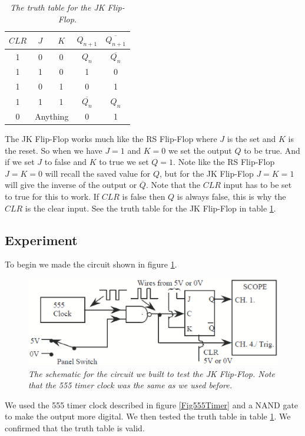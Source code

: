 \documentclass[11pt]{article}
\numberwithin{equation}{section}
\numberwithin{figure}{section}
\numberwithin{table}{section}
\begin{document}
\begin{table}[h]
\centering
\begin{tabular}{c|cc|cc}
$CLR$	&$J$	&$K$	&$Q_{n+1}$		&$\overline{Q_{n+1}}$\\
\hline
1	&0	&0	&$Q_n$			&$\overline{Q_n}$\\
1	&1	&0	&1			&0\\
1	&0	&1	&0			&1\\
1	&1	&1	&$\overline{Q_n}$	&$Q_n$\\
\hline
0	&\multicolumn{2}{c}{Anything}	&0	&1
\end{tabular}
\caption{\textit{The truth table for the JK Flip-Flop.}}
\label{TruthTabJK}
\end{table}
The JK Flip-Flop works much like the RS Flip-Flop where $J$ is the set and $K$ is the reset. So when we have $J=1$ and $K=0$ we set the output $Q$ to be true. And if we set $J$ to false and $K$ to true we set $Q=1$. Note like the RS Flip-Flop $J=K=0$ will recall the saved value for $Q$, but for the JK Flip-Flop $J=K=1$ will give the inverse of the output or $\overline{Q}$. Note that the $CLR$ input has to be set to true for this to work. If $CLR$ is false then $Q$ is always false, this is why the $CLR$ is the clear input. See the truth table for the JK Flip-Flop in table \ref{TruthTabJK}.

\subsection{Experiment}
To begin we made the circuit shown in figure \ref{FigSchemJKFlipFlop}.
\begin{figure}[h]
\centering
\includegraphics[scale=0.60]{FigSchemJKFlipFlop.eps}
\caption{\textit{The schematic for the circuit we built to test the JK Flip-Flop. Note that the 555 timer clock was the same as we used before.}}
\label{FigSchemJKFlipFlop}
\end{figure}
We used the 555 timer clock described in figure \ref{Fig555Timer} and a NAND gate to make the output more digital. We then tested the truth table in table \ref{TruthTabJK}. We confirmed that the truth table is valid.
\end{document}
